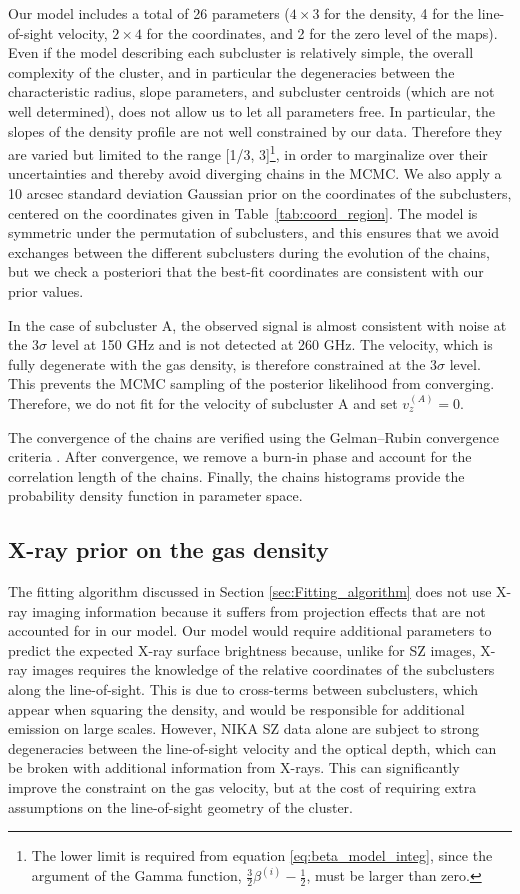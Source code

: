 \documentclass[twocolumn,traditabstract]{aa}
\begin{document}
Our model includes a total of 26 parameters ($4 \times 3$ for the density, 4 for the line-of-sight velocity, $2 \times 4$ for the coordinates, and 2 for the zero level of the maps). Even if the model describing each subcluster is relatively simple, the overall complexity of the cluster, and in particular the degeneracies between the characteristic radius, slope parameters, and subcluster centroids (which are not well determined), does not allow us to let all parameters free. In particular, the slopes of the density profile are not well constrained by our data. Therefore they are varied but limited to the range [1/3, 3]\footnote{The lower limit is required from equation \ref{eq:beta_model_integ}, since the argument of the Gamma function, $\frac{3}{2} \beta^{(i)} -\frac{1}{2}$, must be larger than zero.}, in order to marginalize over their uncertainties and thereby avoid diverging chains in the MCMC. We also apply a 10 arcsec standard deviation Gaussian prior on the coordinates of the subclusters, centered on the coordinates given in Table~\ref{tab:coord_region}. The model is symmetric under the permutation of subclusters, and this ensures that we avoid exchanges between the different subclusters during the evolution of the chains, but we check a posteriori that the best-fit coordinates are consistent with our prior values.

In the case of subcluster A, the observed signal is almost consistent with noise at the $3 \sigma$ level at 150 GHz and is not detected at 260 GHz. The velocity, which is fully degenerate with the gas density, is therefore constrained at the $3 \sigma$ level. This prevents the MCMC sampling of the posterior likelihood from converging. Therefore, we do not fit for the velocity of subcluster A and set $v_z^{(A)} = 0$.

The convergence of the chains are verified using the Gelman--Rubin convergence criteria \citep{Gelman1992}. After convergence, we remove a burn-in phase and account for the correlation length of the chains. Finally, the chains histograms provide the probability density function in parameter space.

\subsection{X-ray prior on the gas density}
The fitting algorithm discussed in Section \ref{sec:Fitting_algorithm} does not use X-ray imaging information because it suffers from projection effects that are not accounted for in our model. Our model would require additional parameters to predict the expected X-ray surface brightness because, unlike for SZ images, X-ray images requires the knowledge of the relative coordinates of the subclusters along the line-of-sight. This is due to cross-terms between subclusters, which appear when squaring the density, and would be responsible for additional emission on large scales. However, NIKA SZ data alone are subject to strong degeneracies between the line-of-sight velocity and the optical depth, which can be broken with additional information from X-rays. This can significantly improve the constraint on the gas velocity, but at the cost of requiring extra assumptions on the line-of-sight geometry of the cluster.
\end{document}
